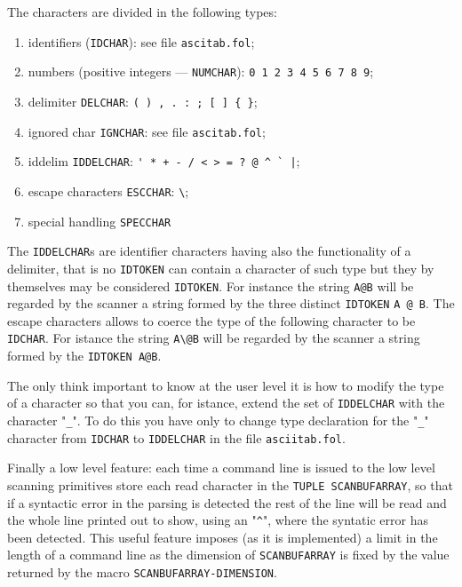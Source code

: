 The characters are divided in the following types:

\begin{enumerate}
	\item
		identifiers ({\tt IDCHAR}): see file
		\verb+ascitab.fol+;
	\item
		numbers (positive integers --- {\tt NUMCHAR}):
		\verb+0 1 2 3 4 5 6 7 8 9+;
	\item
		delimiter {\tt DELCHAR}:
		\verb+( ) , . : ; [ ] { }+;
	\item
		ignored char {\tt IGNCHAR}: see file
		\verb+ascitab.fol+;
	\item
		iddelim {\tt IDDELCHAR}:
        \verb$' * + - / < > = ? @ ^ ` |$;
	\item
		escape characters {\tt ESCCHAR}:
		\verb+\+;
	\item
		special handling {\tt SPECCHAR}
\end{enumerate}

The \verb+IDDELCHAR+s are identifier characters having also the functionality
of a delimiter, that is no \verb+IDTOKEN+ can contain a character of such
type but they by themselves may be considered \verb+IDTOKEN+.
For instance the string \verb+A@B+ will be regarded by the scanner a string
formed by the three distinct \verb+IDTOKEN+ \verb+A @ B+.
The escape characters allows to coerce the type of the following
character to be \verb+IDCHAR+.
For istance the string \verb+A\@B+ will be regarded by the scanner a string
formed by the \verb+IDTOKEN A@B+.

The only think important to know at the user level it is how to modify the type
of a character so that you can, for istance, extend the set of \verb+IDDELCHAR+
with the character "\verb+_+". To do this you have only to change type
declaration for the "\verb+_+" character from \verb+IDCHAR+ to \verb+IDDELCHAR+
in the file {\tt asciitab.fol}.

Finally a low level feature: each time a command line is issued to {\GF} the low
level scanning primitives store each read character in the {\tt TUPLE
SCANBUFARRAY}, so that if a syntactic error in the parsing is detected the rest
of the line will be read and the whole line printed out to show, using an
"\verb+^+", where the syntatic error has been detected. This useful feature
imposes (as it is implemented) a limit in the length of a {\GF} command line as
the dimension of \verb+SCANBUFARRAY+ is fixed by the value returned by the macro
\verb+SCANBUFARRAY-DIMENSION+.
